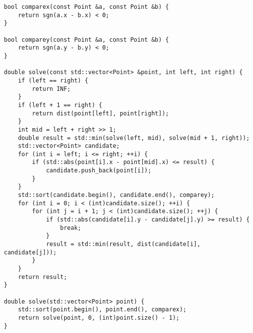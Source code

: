 \begin{lstlisting}
bool comparex(const Point &a, const Point &b) {
    return sgn(a.x - b.x) < 0;
}

bool comparey(const Point &a, const Point &b) {
    return sgn(a.y - b.y) < 0;
}

double solve(const std::vector<Point> &point, int left, int right) {
    if (left == right) {
        return INF;
    }
    if (left + 1 == right) {
        return dist(point[left], point[right]);
    }
    int mid = left + right >> 1;
    double result = std::min(solve(left, mid), solve(mid + 1, right));
    std::vector<Point> candidate;
    for (int i = left; i <= right; ++i) {
        if (std::abs(point[i].x - point[mid].x) <= result) {
            candidate.push_back(point[i]);
        }
    }
    std::sort(candidate.begin(), candidate.end(), comparey);
    for (int i = 0; i < (int)candidate.size(); ++i) {
        for (int j = i + 1; j < (int)candidate.size(); ++j) {
            if (std::abs(candidate[i].y - candidate[j].y) >= result) {
                break;
            }
            result = std::min(result, dist(candidate[i], candidate[j]));
        }
    }
    return result;
}

double solve(std::vector<Point> point) {
    std::sort(point.begin(), point.end(), comparex);
    return solve(point, 0, (int)point.size() - 1);
}
\end{lstlisting}
